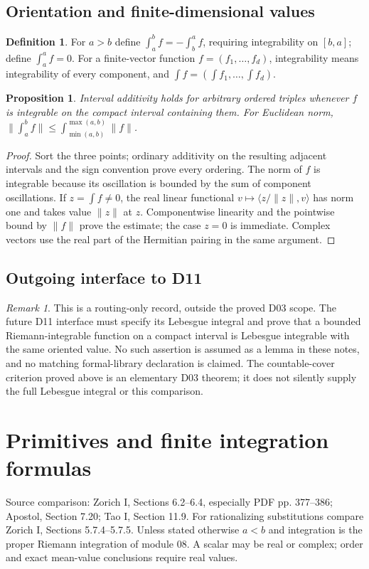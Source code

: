 \documentclass[11pt,oneside,a4paper]{book}
\newtheorem{proposition}[theorem]{Proposition}
\theoremstyle{definition}
\newtheorem{definition}[theorem]{Definition}
\theoremstyle{remark}
\newtheorem{remark}[theorem]{Remark}
\newcommand{\KEntry}[2]{\Needspace{7\baselineskip}\section{#2}\label{#1}{\small\sffamily\color{black!60}\detokenize{#1}}\par}
\newcommand{\SourceRef}[1]{{\small\textsf{Source comparison: #1.}}}
\begin{document}
\KEntry{K03.08.oriented}{Orientation and finite-dimensional values}
\begin{definition}
For $a>b$ define $\int_a^bf=-\int_b^af$, requiring integrability on
$[b,a]$; define $\int_a^af=0$. For a finite-vector function
$f=(f_1,\ldots,f_d)$, integrability means integrability of every component,
and $\int f=(\int f_1,\ldots,\int f_d)$.
\end{definition}
\begin{proposition}
Interval additivity holds for arbitrary ordered triples whenever $f$ is
integrable on the compact interval containing them. For Euclidean norm,
$\|\int_a^bf\|\le\int_{\min(a,b)}^{\max(a,b)}\|f\|$.
\end{proposition}
\begin{proof}
Sort the three points; ordinary additivity on the resulting adjacent
intervals and the sign convention prove every ordering. The norm of $f$
is integrable because its oscillation is bounded by the sum of component
oscillations. If $z=\int f\ne0$, the real linear functional
$v\mapsto\langle z/\|z\|,v\rangle$ has norm one and takes value
$\|z\|$ at $z$. Componentwise linearity and the pointwise bound by
$\|f\|$ prove the estimate; the case $z=0$ is immediate. Complex
vectors use the real part of the Hermitian pairing in the same argument.
\end{proof}

\KEntry{K03.08.bridge_lebesgue}{Outgoing interface to D11}
\begin{remark}
This is a routing-only record, outside the proved D03 scope. The future
D11 interface must specify its Lebesgue integral and prove that a bounded
Riemann-integrable function on a compact interval is Lebesgue integrable
with the same oriented value. No such assertion is assumed as a lemma
in these notes, and no matching formal-library declaration is claimed.
The countable-cover criterion proved above is an elementary D03 theorem;
it does not silently supply the full Lebesgue integral or this comparison.
\end{remark}



\chapter{Primitives and finite integration formulas}
\SourceRef{Zorich I, Sections 6.2--6.4, especially PDF pp. 377--386; Apostol, Section 7.20; Tao I, Section 11.9. For rationalizing substitutions compare Zorich I, Sections 5.7.4--5.7.5}
Unless stated otherwise $a<b$ and integration is the proper Riemann
integration of module 08. A scalar may be real or complex; order and exact
mean-value conclusions require real values.
\end{document}
